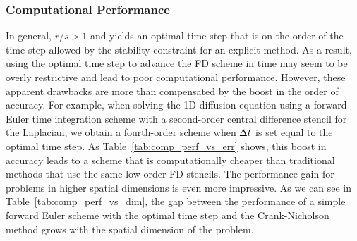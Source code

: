 \documentclass[oneeqnum,onefignum,onetabnum,onethmnum]{siamltex}
\begin{document}
\subsubsection*{\label{sec:computational_performance} 
                Computational Performance}
In general, $r/s > 1$ and yields an optimal time step that is on the order
of the time step allowed by the stability constraint for an explicit method.
As a result, using the optimal time step to advance the FD scheme in time
may seem to be overly restrictive and lead to poor computational performance.
However, these apparent drawbacks are more than compensated by the boost in 
the order of accuracy.  For example, when solving the 1D diffusion equation 
using a forward Euler time integration scheme with a second-order central 
difference stencil for the Laplacian, we obtain a fourth-order scheme 
when $\Delta t$ is set equal to the optimal time step.  As
Table~\ref{tab:comp_perf_vs_err} shows, this boost in accuracy leads to a
scheme that is computationally cheaper than traditional methods that use 
the same low-order FD stencils.  The performance gain for problems in higher 
spatial dimensions is even more impressive.  As we can see in 
Table~\ref{tab:comp_perf_vs_dim}, the gap between the performance of a
simple forward Euler scheme with the optimal time step and the Crank-Nicholson
method grows with the spatial dimension of the problem.  
\end{document}
